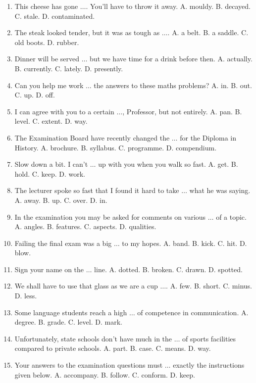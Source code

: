 \documentclass{article}
\numberwithin{equation}{section}
\begin{document}
\begin{enumerate}[leftmargin=8mm]
	\item This cheese has gone $\ldots$. You'll have to throw it away. {\sf A.} mouldy. {\sf B.} decayed. {\sf C.} stale. {\sf D.} contaminated.
	\item The steak looked tender, but it was as tough as $\ldots$. {\sf A.} a belt. {\sf B.} a saddle. {\sf C.} old boots. {\sf D.} rubber.
	\item Dinner will be served $\ldots$ but we have time for a drink before then. {\sf A.} actually. {\sf B.} currently. {\sf C.} lately. {\sf D.} presently.
	\item Can you help me work $\ldots$ the answers to these maths problems? {\sf A.} in. {\sf B.} out. {\sf C.} up. {\sf D.} off.
	\item I can agree with you to a certain $\ldots$, Professor, but not entirely. {\sf A.} pan. {\sf B.} level. {\sf C.} extent. {\sf D.} way.
	\item The Examination Board have recently changed the $\ldots$ for the Diploma in History. {\sf A.} brochure. {\sf B.} syllabus. {\sf C.} programme. {\sf D.} compendium.
	\item Slow down a bit. I can't $\ldots$ up with you when you walk so fast. {\sf A.} get. {\sf B.} hold. {\sf C.} keep. {\sf D.} work.
	\item The lecturer spoke so fast that I found it hard to take $\ldots$ what he was saying. {\sf A.} away. {\sf B.} up. {\sf C.} over. {\sf D.} in.
	\item In the examination you may be asked for comments on various $\ldots$ of a topic. {\sf A.} angles. {\sf B.} features. {\sf C.} aspects. {\sf D.} qualities.
	\item Failing the final exam was a big $\ldots$ to my hopes. {\sf A.} band. {\sf B.} kick. {\sf C.} hit. {\sf D.} blow.
	\item Sign your name on the $\ldots$ line. {\sf A.} dotted. {\sf B.} broken. {\sf C.} drawn. {\sf D.} spotted.
	\item We shall have to use that glass as we are a cup $\ldots$. {\sf A.} few. {\sf B.} short. {\sf C.} minus. {\sf D.} less.
	\item Some language students reach a high $\ldots$ of competence in communication. {\sf A.} degree. {\sf B.} grade. {\sf C.} level. {\sf D.} mark.
	\item Unfortunately, state schools don't have much in the $\ldots$ of sports facilities compared to private schools. {\sf A.} part. {\sf B.} case. {\sf C.} means. {\sf D.} way.
	\item Your answers to the examination questions must $\ldots$ exactly the instructions given below. {\sf A.} accompany. {\sf B.} follow. {\sf C.} conform. {\sf D.} keep.

\end{enumerate}
\end{document}
